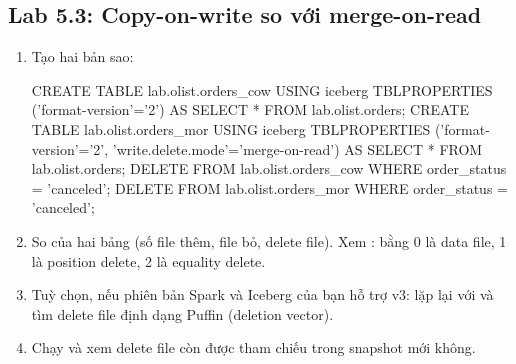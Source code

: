 \subsection{Lab 5.3: Copy-on-write so với merge-on-read}
\begin{enumerate}
  \item Tạo hai bản sao:
\begin{codeblock}
CREATE TABLE lab.olist.orders_cow USING iceberg
  TBLPROPERTIES ('format-version'='2') AS SELECT * FROM lab.olist.orders;
CREATE TABLE lab.olist.orders_mor USING iceberg
  TBLPROPERTIES ('format-version'='2', 'write.delete.mode'='merge-on-read')
  AS SELECT * FROM lab.olist.orders;
DELETE FROM lab.olist.orders_cow WHERE order_status = 'canceled';
DELETE FROM lab.olist.orders_mor WHERE order_status = 'canceled';
\end{codeblock}
  \item So  của hai bảng (số file thêm, file bỏ, delete file). Xem :  bằng 0 là data file, 1 là position delete, 2 là equality delete.
  \item Tuỳ chọn, nếu phiên bản Spark và Iceberg của bạn hỗ trợ v3: lặp lại với  và tìm delete file định dạng Puffin (deletion vector).
  \item Chạy  và xem delete file còn được tham chiếu trong snapshot mới không.
\end{enumerate}

